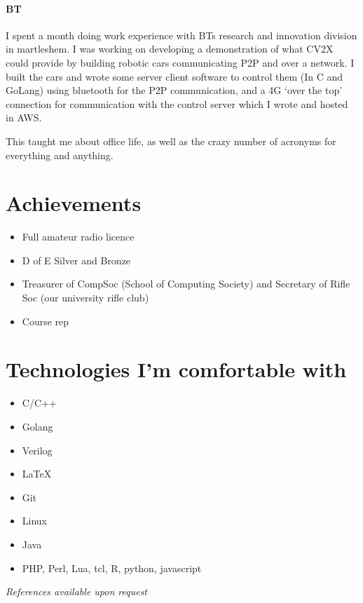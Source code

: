 \documentclass[9pt,a4paper]{article}
\begin{document}
\begin{multicols*}{2}
\paragraph{BT} I spent a month doing work experience with BTs research and innovation division in martleshem.
I was working on developing a demonstration of what CV2X could provide by building robotic cars communicating P2P and over a network.
I built the cars and wrote some server client software to control them (In C and GoLang) using bluetooth for the P2P communication, and a 4G `over the top' connection for communication with the control server which I wrote and hosted in AWS.

This taught me about office life, as well as the crazy number of acronyms for everything and anything.

\section*{Achievements}
\begin{itemize}
	\item Full amateur radio licence

	\item D of E Silver and Bronze

  \item Treasurer of CompSoc (School of Computing Society) and Secretary of Rifle Soc (our university rifle club)

	\item Course rep
\end{itemize}


\section*{Technologies I'm comfortable with}
\begin{multicols*}{2}
\begin{itemize}
\item C/C++
\item Golang
\item Verilog
\item \LaTeX 
\item Git
\item Linux
\item Java
\item PHP, Perl, Lua, tcl, R, python, javascript
\end{itemize}
\end{multicols*}
\vfill
\textit{References available upon request}
\end{multicols*}
\end{document}
